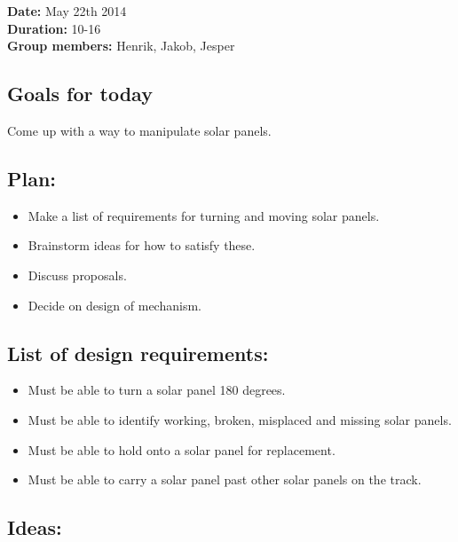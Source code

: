 \textbf{Date:} May 22th 2014\\\textbf{Duration:} 10-16\\\textbf{Group
members:} Henrik, Jakob, Jesper

\subsection{Goals for today}

Come up with a way to manipulate solar panels.

\subsection{Plan:}

\begin{itemize}
\itemsep1pt\parskip0pt
\item
  Make a list of requirements for turning and moving solar panels.
\item
  Brainstorm ideas for how to satisfy these.
\item
  Discuss proposals.
\item
  Decide on design of mechanism.
\end{itemize}

\subsection{List of design requirements:}

\begin{itemize}
\itemsep1pt\parskip0pt
\item
  Must be able to turn a solar panel 180 degrees.
\item
  Must be able to identify working, broken, misplaced and missing solar
  panels.
\item
  Must be able to hold onto a solar panel for replacement.
\item
  Must be able to carry a solar panel past other solar panels on the
  track.
\end{itemize}

\subsection{Ideas:}

